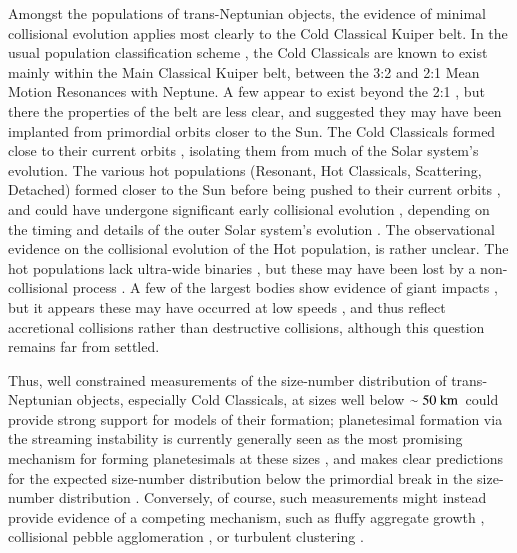 \documentclass[printer]{aa}
\newcommand{\revised}{\color{black}}
\begin{document}
Amongst the populations of trans-Neptunian objects, the evidence of minimal collisional evolution applies most clearly to the Cold Classical Kuiper belt.  In the usual population classification scheme \citep{2008ssbn.book...43G}, the Cold Classicals are known to exist mainly within the Main Classical Kuiper belt, between the 3:2 and 2:1 Mean Motion Resonances with Neptune.  A few appear to exist beyond the 2:1 \citep{2018ApJS..236...18B}, but there the properties of the belt are less clear, and \citet{nesvorny2020eccentric} suggested they may have been implanted from primordial orbits closer to the Sun.  The Cold Classicals formed close to their current orbits \citep{2012ApJ...750...43D, 2015AJ....150...68N}, isolating them from much of the Solar system's evolution.  The various hot populations (Resonant, Hot Classicals, Scattering, Detached) formed closer to the Sun before being pushed to their current orbits \citep{1993Natur.365..819M, 2008Icar..196..258L,2014AJ....148...56B,2019AJ....158...64V}, and could have undergone significant early collisional evolution \citep{2007Icar..188..468C,2012MNRAS.423.1254C,2019MNRAS.485.5511S}, depending on the timing and details of the outer Solar system's evolution \citep{2005Natur.435..466G,2018Icar..305..262M,2018NatAs...2..878N}.  The observational evidence on the collisional evolution of the Hot population, is rather unclear.  The hot populations lack ultra-wide binaries \citep{2019Icar..334...62G}, but these may have been lost by a non-collisional process \citep{2010ApJ...722L.204P}.  A few of the largest bodies show evidence of giant impacts \citep{2005Sci...307..546C, 2007Natur.446..294B}, but it appears these may have occurred at low speeds \citep{2011AJ....141...35C,2019AJ....157..230P,2020NatAs...4...89P}, and thus reflect accretional collisions rather than destructive collisions, although this question remains far from settled.

Thus, well constrained measurements of the size-number distribution of trans-Neptunian objects, especially Cold Classicals, at sizes well below $\sim 50~\rm{km}$~could provide strong support for models of their formation; planetesimal formation via the streaming instability \citep{2005ApJ...620..459Y, 2007Natur.448.1022J} is currently generally seen as the most promising mechanism for forming planetesimals at these sizes \citep{2022ASSL..466....3R}, and makes clear predictions for the expected size-number distribution {\revised below the primordial break in the size-number distribution} \citep{2016ApJ...822...55S,2017ApJ...847L..12S}.  Conversely, of course, such measurements might instead provide evidence of a competing mechanism, such as fluffy aggregate growth \citep{2016ApJ...832L..19A}, collisional pebble agglomeration \citep{2016ApJ...818..175S}, or turbulent clustering \citep{2010Icar..208..518C,2016LPI....47.2661C,2020ApJ...892..120H}.
\end{document}

